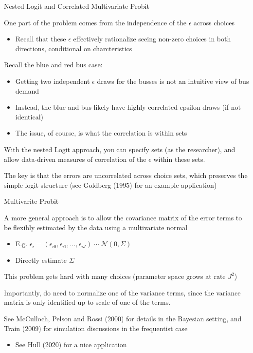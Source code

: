 \documentclass[notes,11pt, aspectratio=169]{beamer}
\newenvironment{wideitemize}{\itemize\addtolength{\itemsep}{10pt}}{\enditemize}
\begin{document}
\begin{frame}{Nested Logit and Correlated Multivariate Probit}
  \begin{wideitemize}
  \item One part of the problem comes from the independence of the
    $\epsilon$ across choices
    \begin{itemize}
    \item Recall that these $\epsilon$ effectively rationalize seeing
      non-zero choices in both directions, conditional on charcteristics
    \end{itemize}
  \item Recall the blue and red bus case:
    \begin{itemize}
    \item Getting two independent $\epsilon$ draws for the busses is not an intuitive
      view of bus demand
    \item Instead, the blue and bus likely have highly
      correlated epsilon draws (if not identical)
    \item The issue, of course, is what the correlation is within sets 
    \end{itemize}
  \item With the nested Logit approach, you can specify sets (as the
    researcher), and allow data-driven measures of correlation of the
    $\epsilon$ within these sets.
  \item The key is that the errors are uncorrelated across choice sets, which preserves
    the simple logit structure (see Goldberg (1995) for an example application)
  \end{wideitemize}
\end{frame}

\begin{frame}{Multivarite Probit}
    \begin{wideitemize}
    \item A more general approach is to allow the covariance matrix of
      the error terms to be flexibly estimated by the data using a multivariate normal
      \begin{itemize}
      \item E.g. $\epsilon_{i} = (\epsilon_{i0},\epsilon_{i1},\ldots, \epsilon_{iJ}) \sim \mathcal{N}(0, \Sigma)$
      \item Directly estimate $\Sigma$
      \end{itemize}
    \item This problem gets hard with many choices (parameter space grows at rate $J^{2}$)
    \item Importantly, do need to normalize one of the variance terms,
      since the variance matrix is only identified up to scale of one
      of the terms.
    \item See McCulloch, Pelson and Rossi (2000) for details in the
      Bayesian setting, and Train (2009) for simulation discussions in
      the frequentist case
      \begin{itemize}
      \item See Hull (2020) for a nice application
      \end{itemize}
  \end{wideitemize}
\end{frame}
\end{document}
